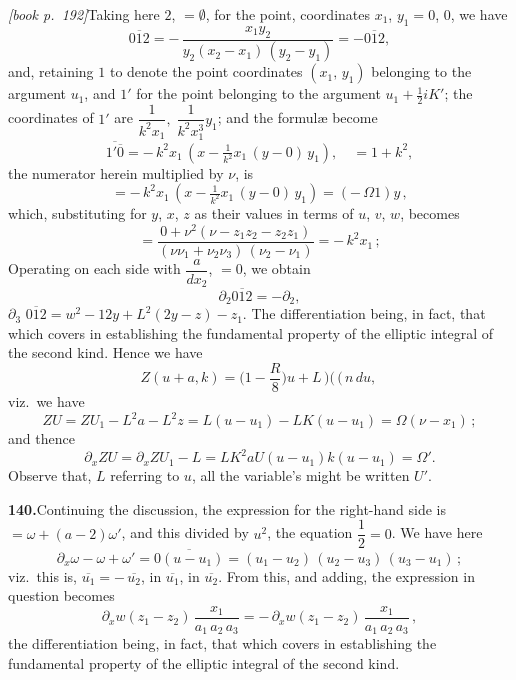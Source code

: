 \documentclass[11pt,a4paper]{article}
\begin{document}
\medskip\noindent\textit{[book p.~192]}\quad Taking here $2$, $= \emptyset$, for the point, coordinates $x_1$, $y_1 = 0$, $0$, we have
\[
\overline{012} = -\,\frac{x_1y_2}{y_2(x_2 - x_1)\,(y_2 - y_1)} = -\overline{012},
\]
and, retaining $1$ to denote the point coordinates $(x_1,\,y_1)$ belonging to the argument $u_1$, and $1'$ for the point belonging to the argument $u_1 + \tfrac{1}{2}iK'$; the coordinates of $1'$ are $\dfrac{1}{k^2 x_1},\;\dfrac{1}{k^2 x_1^3} y_1$; and the formul\ae{} become
\[
\overline{1'\overline{0}} = -\,k^2 x_1\,(x - \tfrac{1}{k^2}x_1\,(y - 0)\,y_1),\quad = 1 + k^2,
\]
the numerator herein multiplied by $\nu$, is
\[
= -\,k^2 x_1\,(x - \tfrac{1}{k^2}x_1\,(y - 0)\,y_1) = (-\,\Omega 1)y\,,
\]
which, substituting for $y$, $x$, $z$ as their values in terms of $u$, $v$, $w$, becomes
\[
= \frac{0 + \nu^2(\nu - z_1 z_2 - z_2 z_1)}{(\nu \nu_1 + \nu_2 \nu_3)\,(\nu_2 - \nu_1)} = -\,k^2 x_1\,;
\]
Operating on each side with $\dfrac{a}{dx_2}$, $= 0$, we obtain
\[
\partial_2 \overline{012} = -\partial_2,
\]
$\partial_3$ $\overline{012} = w^2 - 12y + L^2 (2y - z) - z_1$. The differentiation being, in fact, that which covers in establishing the fundamental property of the elliptic integral of the second kind. Hence we have
\[
Z(u + a, k) = \bigl(1 - \dfrac{R}{8}\bigr)u + L\!\,\mbox{$)\!($}\,(\,n\,du,\,
\]
viz.\ we have
\[
ZU = ZU_1 - L^2 a - L^2 z = L(u - u_1) - LK(u - u_1) = \Omega(\nu - x_1)\,;
\]
and thence
\[
\partial_x ZU = \partial_x ZU_1 - L = LK^2 a U(u - u_1)k(u - u_1) = \Omega'.
\]
Observe that, $L$ referring to $u$, all the variable's might be written $U'$.

\medskip\noindent\textbf{140.}\quad Continuing the discussion, the expression for the right-hand side is $= \omega + (a - 2)\omega'$, and this divided by $u^2$, the equation $\dfrac{1}{2} = 0$. We have here
\[
\partial_x \omega - \omega + \omega' = \overline{0(u - u_1)} = (u_1 - u_2)\,(u_2 - u_3)\,(u_3 - u_1)\,;
\]
viz.\ this is, $\overline{u_1} = -\,\overline{u_2}$, in $\overline{u_1}$, in $\overline{u_2}$. From this, and adding, the expression in question becomes
\[
\partial_x w(z_1 - z_2)\,\frac{x_1}{a_1\,a_2\,a_3} = -\,\partial_x w(z_1 - z_2)\,\frac{x_1}{a_1\,a_2\,a_3}\,,
\]
the differentiation being, in fact, that which covers in establishing the fundamental property of the elliptic integral of the second kind.
\end{document}
